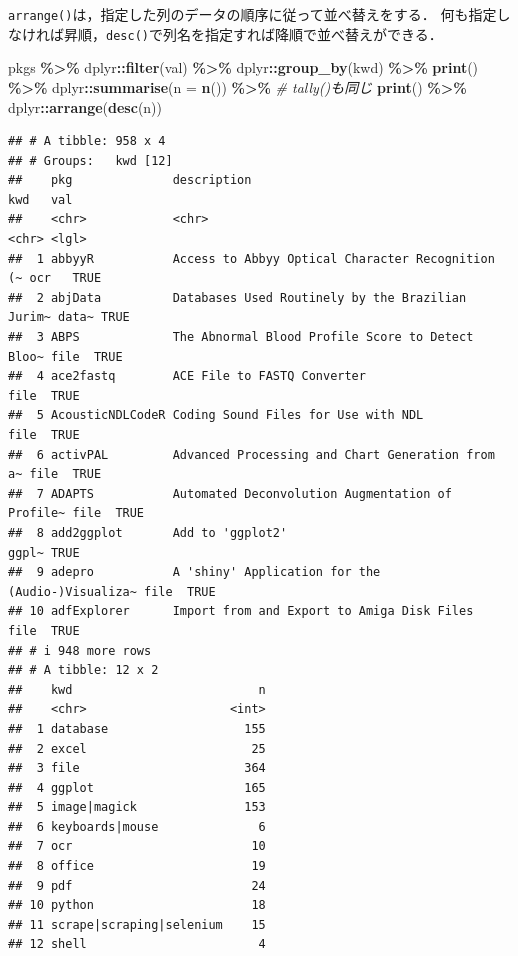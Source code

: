 \documentclass[
]{article}
\newenvironment{Shaded}{\begin{snugshade}}{\end{snugshade}}
\newcommand{\AttributeTok}[1]{\textcolor[rgb]{0.13,0.29,0.53}{#1}}
\newcommand{\CommentTok}[1]{\textcolor[rgb]{0.56,0.35,0.01}{\textit{#1}}}
\newcommand{\FunctionTok}[1]{\textcolor[rgb]{0.13,0.29,0.53}{\textbf{#1}}}
\newcommand{\NormalTok}[1]{#1}
\newcommand{\SpecialCharTok}[1]{\textcolor[rgb]{0.81,0.36,0.00}{\textbf{#1}}}
\begin{document}
\texttt{arrange()}は，指定した列のデータの順序に従って並べ替えをする．
何も指定しなければ昇順，\texttt{desc()}で列名を指定すれば降順で並べ替えができる．

\begin{Shaded}
\begin{Highlighting}[]
\NormalTok{pkgs }\SpecialCharTok{\%\textgreater{}\%}
\NormalTok{  dplyr}\SpecialCharTok{::}\FunctionTok{filter}\NormalTok{(val) }\SpecialCharTok{\%\textgreater{}\%}
\NormalTok{  dplyr}\SpecialCharTok{::}\FunctionTok{group\_by}\NormalTok{(kwd) }\SpecialCharTok{\%\textgreater{}\%}
  \FunctionTok{print}\NormalTok{() }\SpecialCharTok{\%\textgreater{}\%}
\NormalTok{  dplyr}\SpecialCharTok{::}\FunctionTok{summarise}\NormalTok{(}\AttributeTok{n =} \FunctionTok{n}\NormalTok{()) }\SpecialCharTok{\%\textgreater{}\%} \CommentTok{\# tally()も同じ}
  \FunctionTok{print}\NormalTok{() }\SpecialCharTok{\%\textgreater{}\%}
\NormalTok{  dplyr}\SpecialCharTok{::}\FunctionTok{arrange}\NormalTok{(}\FunctionTok{desc}\NormalTok{(n))}
\end{Highlighting}
\end{Shaded}

\begin{verbatim}
## # A tibble: 958 x 4
## # Groups:   kwd [12]
##    pkg              description                                      kwd   val  
##    <chr>            <chr>                                            <chr> <lgl>
##  1 abbyyR           Access to Abbyy Optical Character Recognition (~ ocr   TRUE 
##  2 abjData          Databases Used Routinely by the Brazilian Jurim~ data~ TRUE 
##  3 ABPS             The Abnormal Blood Profile Score to Detect Bloo~ file  TRUE 
##  4 ace2fastq        ACE File to FASTQ Converter                      file  TRUE 
##  5 AcousticNDLCodeR Coding Sound Files for Use with NDL              file  TRUE 
##  6 activPAL         Advanced Processing and Chart Generation from a~ file  TRUE 
##  7 ADAPTS           Automated Deconvolution Augmentation of Profile~ file  TRUE 
##  8 add2ggplot       Add to 'ggplot2'                                 ggpl~ TRUE 
##  9 adepro           A 'shiny' Application for the (Audio-)Visualiza~ file  TRUE 
## 10 adfExplorer      Import from and Export to Amiga Disk Files       file  TRUE 
## # i 948 more rows
## # A tibble: 12 x 2
##    kwd                          n
##    <chr>                    <int>
##  1 database                   155
##  2 excel                       25
##  3 file                       364
##  4 ggplot                     165
##  5 image|magick               153
##  6 keyboards|mouse              6
##  7 ocr                         10
##  8 office                      19
##  9 pdf                         24
## 10 python                      18
## 11 scrape|scraping|selenium    15
## 12 shell                        4
\end{verbatim}
\end{document}
